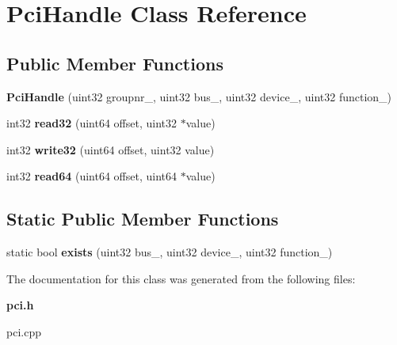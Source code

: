 \section{Pci\+Handle Class Reference}
\label{classPciHandle}
\subsection*{Public Member Functions}
\begin{DoxyCompactItemize}
\item 
{\bfseries Pci\+Handle} (uint32 groupnr\+\_\+, uint32 bus\+\_\+, uint32 device\+\_\+, uint32 function\+\_\+)\label{classPciHandle_a95e2bf928bd4438831c5a3b5b516efe6}

\item 
int32 {\bfseries read32} (uint64 offset, uint32 $\ast$value)\label{classPciHandle_a76d15c7331d5fddd98d42e8a2316fb7c}

\item 
int32 {\bfseries write32} (uint64 offset, uint32 value)\label{classPciHandle_a1975782af9943f65ba1312ff56fb30b1}

\item 
int32 {\bfseries read64} (uint64 offset, uint64 $\ast$value)\label{classPciHandle_a2f965ad969df3add9c955eaaeb43e715}

\end{DoxyCompactItemize}
\subsection*{Static Public Member Functions}
\begin{DoxyCompactItemize}
\item 
static bool {\bfseries exists} (uint32 bus\+\_\+, uint32 device\+\_\+, uint32 function\+\_\+)\label{classPciHandle_ab8c230bbb0c045a1cedd4784df86e3c3}

\end{DoxyCompactItemize}


The documentation for this class was generated from the following files\+:\begin{DoxyCompactItemize}
\item 
{\bf pci.\+h}\item 
pci.\+cpp\end{DoxyCompactItemize}
